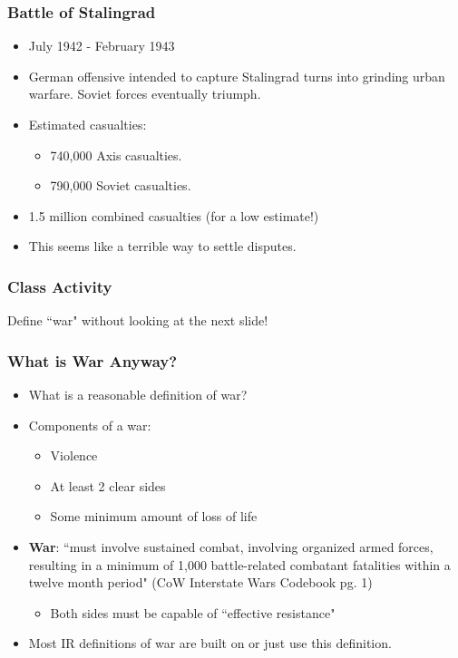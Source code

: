 \documentclass{beamer}
\begin{document}
\begin{frame} 
	\frametitle{\LARGE{Battle of Stalingrad}}	
	\begin{itemize}
		\item July 1942 - February 1943
		\item German offensive intended to capture Stalingrad turns into grinding urban warfare. Soviet forces eventually triumph. \pause
		\item Estimated casualties: 
		\begin{itemize}
			\item 740,000 Axis casualties. \pause
			\item 790,000 Soviet casualties. \pause
		\end{itemize}
		\item 1.5 million combined casualties (for a low estimate!) \pause
		\item This seems like a terrible way to settle disputes.
	\end{itemize}
\end{frame}

\begin{frame} 
	\frametitle{\LARGE{Class Activity}}	
		\begin{center}
		\LARGE Define ``war"  without looking at the next slide!
	\end{center}
\end{frame}

\begin{frame} 
	\frametitle{\LARGE{What is War Anyway?}}
	\begin{itemize}
		\item What is a reasonable definition of war? \pause
		\item Components of a war: \pause
		\begin{itemize}
			\item Violence \pause
			\item At least 2 clear sides \pause
			\item Some minimum amount of loss of life \pause
		\end{itemize}
		\item \textbf{War}: ``must involve sustained combat, involving organized armed forces, resulting in a minimum of 1,000 battle-related combatant fatalities within a twelve month period" (CoW Interstate Wars Codebook pg. 1) \pause
			\begin{itemize}
			\item Both sides must be capable of ``effective resistance" \pause
			\end{itemize}
		\item Most IR definitions of war are built on or just use this definition.
	\end{itemize}
\end{frame}
\end{document}
